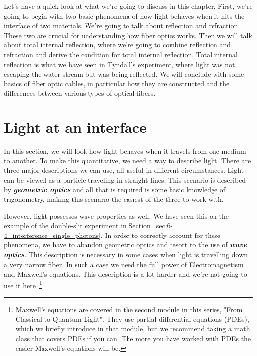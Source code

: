 Let's have a quick look at what we're going to discuss in this chapter.
First, we're going to begin with two basic phenomena of how light behaves when it hits the interface of two materials.
We're going to talk about reflection and refraction.
These two are crucial for understanding how fiber optics works.
Then we will talk about total internal reflection, where we're going to combine reflection and refraction and derive the condition for total internal reflection.
Total internal reflection is what we have seen in Tyndall's experiment, where light was not escaping the water stream but was being reflected.
We will conclude with some basics of fiber optic cables, in particular how they are constructed and the differences between various types of optical fibers.


\section{Light at an interface}
\label{sec:7-2_light_at_interface}

In this section, we will look how light behaves when it travels from one medium to another.
To make this quantitative, we need a way to describe light. 
There are three major descriptions we can use, all useful in different circumstances.
Light can be viewed as a particle traveling in straight lines.
This scenario is described by \textit{\textbf{geometric optics}} and all that is required is some basic knowledge of trigonometry, making this scenario the easiest of the three to work with.

However, light possesses wave properties as well.
We have seen this on the example of the double-slit experiment in Section~\ref{sec:6-4_interference_single_photons}. 
In order to correctly account for these phenomena, we have to abandon geometric optics and resort to the use of \textit{\textbf{wave optics}}.
This description is necessary in some cases when light is travelling down a very narrow fiber.
In such a case we need the full power of Electromagnetism and Maxwell's equations.
This description is a lot harder and we're not going to use it here~\footnote{Maxwell's equations are covered in the second module in this series, "From Classical to Quantum Light".  They use partial differential equations (PDEs), which we briefly introduce in that module, but we recommend taking a math class that covers PDEs if you can. The more you have worked with PDEs the easier Maxwell's equations will be.}.

